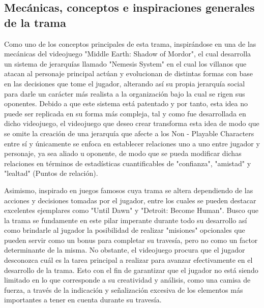 \documentclass{article}
\begin{document}
\subsection{Mecánicas, conceptos e inspiraciones generales de la trama}
Como uno de los conceptos principales de esta trama, inspirándose en una de las mecánicas del videojuego "Middle Earth: Shadow of Mordor", el cual desarrolla un sistema de jerarquías llamado "Nemesis System" \cite{Nemesis} en el cual los villanos que atacan al personaje principal actúan y evolucionan de distintas formas con base en las decisiones que tome el jugador, alterando así su propia jerarquía social para darle un carácter más realista a la organización bajo la cual se rigen sus oponentes. Debido a que este sistema está patentado y por tanto, esta idea no puede ser replicada en su forma más compleja, tal y como fue desarrollada en dicho videojuego, el videojuego que deseo crear transforma esta idea de modo que se omite la creación de una jerarquía que afecte a los Non - Playable Characters entre sí y únicamente se enfoca en establecer relaciones uno a uno entre jugador y personaje, ya sea aliado u oponente, de modo que se pueda modificar dichas relaciones en términos de estadísticas cuantificables de "confianza", "amistad" y "lealtad" (Puntos de relación).

Asimismo, inspirado en juegos famosos cuya trama se altera dependiendo de las acciones y decisiones tomadas por el jugador, entre los cuales se pueden destacar excelentes ejemplares como "Until Dawn" y "Detroit: Become Human". Busco que la trama se fundamente en este pilar imperante durante todo su desarrollo así como brindarle al jugador la posibilidad de realizar "misiones" opcionales que pueden servir como un bonus para completar su travesía, pero no como un factor determinante de la misma. No obstante, el videojuego procura que el jugador desconozca cuál es la tarea principal a realizar para avanzar efectivamente en el desarrollo de la trama. Esto con el fin de garantizar que el jugador no está siendo limitado en lo que corresponde a su creatividad y análisis, como una camisa de fuerza, a través de la indicación y señalización excesiva de los elementos más importantes a tener en cuenta durante su travesía.
\end{document}
